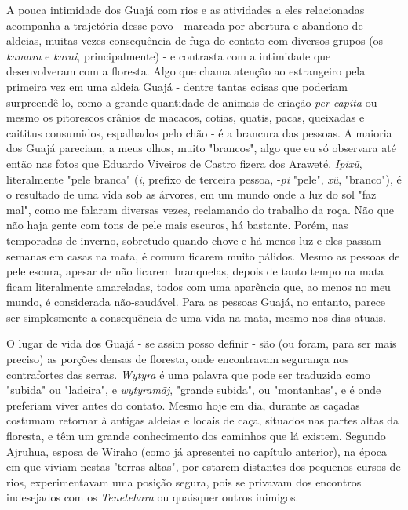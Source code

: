 A pouca intimidade dos Guajá com rios e as atividades a eles
relacionadas acompanha a trajetória desse povo - marcada por abertura e
abandono de aldeias, muitas vezes consequência de fuga do contato com
diversos grupos (os \emph{kamara} e \emph{karai}, principalmente) - e
contrasta com a intimidade que desenvolveram com a floresta. Algo que
chama atenção ao estrangeiro pela primeira vez em uma aldeia Guajá -
dentre tantas coisas que poderiam surpreendê-lo, como a grande
quantidade de animais de criação \emph{per capita} ou mesmo os
pitorescos crânios de macacos, cotias, quatis, pacas, queixadas e
caititus consumidos, espalhados pelo chão - é a brancura das pessoas. A
maioria dos Guajá pareciam, a meus olhos, muito "brancos", algo que eu
só observara até então nas fotos que Eduardo Viveiros de Castro fizera
dos Araweté. \emph{Ipixũ}, literalmente "pele branca" (\emph{i}, prefixo
de terceira pessoa, -\emph{pi} "pele", \emph{xũ}, "branco"), é o
resultado de uma vida sob as árvores, em um mundo onde a luz do sol "faz
mal", como me falaram diversas vezes, reclamando do trabalho da roça.
Não que não haja gente com tons de pele mais escuros, há bastante.
Porém, nas temporadas de inverno, sobretudo quando chove e há menos luz
e eles passam semanas em casas na mata, é comum ficarem muito pálidos.
Mesmo as pessoas de pele escura, apesar de não ficarem branquelas,
depois de tanto tempo na mata ficam literalmente amareladas, todos com
uma aparência que, ao menos no meu mundo, é considerada não-saudável.
Para as pessoas Guajá, no entanto, parece ser simplesmente a
consequência de uma vida na mata, mesmo nos dias atuais.

O lugar de vida dos Guajá - se assim posso definir - são (ou foram, para
ser mais preciso) as porções densas de floresta, onde encontravam
segurança nos contrafortes das serras. \emph{Wytyra} é uma palavra que
pode ser traduzida como "subida" ou "ladeira", e \emph{wytyramãj},
"grande subida", ou "montanhas", e é onde preferiam viver antes do
contato. Mesmo hoje em dia, durante as caçadas costumam retornar à
antigas aldeias e locais de caça, situados nas partes altas da floresta,
e têm um grande conhecimento dos caminhos que lá existem. Segundo
Ajruhua, esposa de Wiraho (como já apresentei no capítulo anterior), na
época em que viviam nestas "terras altas", por estarem distantes dos
pequenos cursos de rios, experimentavam uma posição segura, pois se
privavam dos encontros indesejados com os \emph{Tenetehara} ou quaisquer
outros inimigos.

